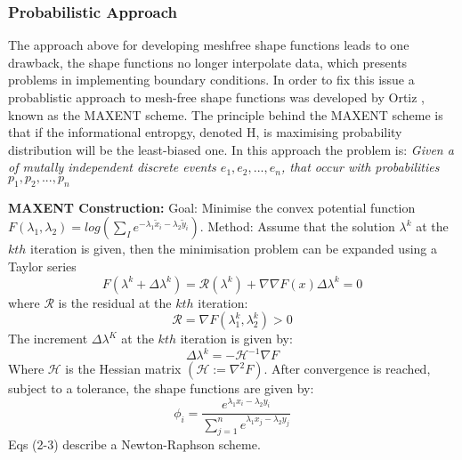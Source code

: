 \subsubsection*{Probabilistic Approach}
The approach above for developing meshfree shape functions leads to one drawback, the shape functions no longer interpolate data, which presents problems in implementing boundary conditions. In order to fix this issue a probablistic approach to mesh-free shape functions was developed by Ortiz \cite{}, known as the MAXENT scheme. The principle behind the MAXENT scheme is that if the informational entropgy, denoted H, is maximising probability distribution will be the least-biased one. In this approach the problem is: \emph{Given a of mutally independent discrete events $e_1,e_2,...,e_n$, that occur with probabilities $p_1,p_2,...,p_n$}
\begin{tcolorbox}
\textbf{MAXENT Construction:}
Goal: Minimise the convex potential function $F(\lambda_1,\lambda_2) = log(\sum_I e^{-\lambda_1 \tilde{x}_i - \lambda_2 \tilde{y}_i})$. Method: Assume that the solution $\lambda^k$ at the $kth$ iteration is given, then the minimisation problem can be expanded using a Taylor series
\begin{equation*}
F(\lambda^k+\Delta \lambda^k) = \mathcal{R}(\lambda^k) + \nabla \nabla F(x) \Delta \lambda^k = 0
\end{equation*}
where $\mathcal{R}$ is the residual at the $kth$ iteration:
\begin{equation*}
\mathcal{R} = \nabla F(\lambda_1^k,\lambda_2^k) > 0 
\end{equation*}
The increment $\Delta \lambda^K$ at the $kth$ iteration is given by:
\begin{equation*}
\Delta \lambda^k = -\mathcal{H}^{-1} \nabla F
\end{equation*}
Where $\mathcal{H}$ is the Hessian matrix $(\mathcal{H}:=\nabla^2 F)$. After convergence is reached, subject to a tolerance, the shape functions are given by:
\begin{equation}
\phi_i = \frac{e^{\lambda_1 x_i - \lambda_2 y_i}}{\sum_{j=1}^ne^{\lambda_1 x_j - \lambda_2 y_j}} 
\end{equation}
Eqs (2-3) describe a Newton-Raphson scheme.
\end{tcolorbox}
